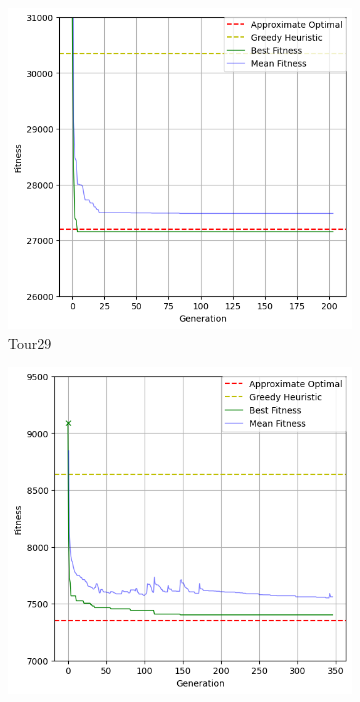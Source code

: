 \documentclass[a4paper,10pt]{article}
\begin{document}
\begin{figure}
\begin{subfigure}[t]{0.5\textwidth}
    \centering
	\includegraphics[width=\textwidth]{results/4.2/tour29_convergence.png}
    \caption{Tour29}
    \label{fig:tour29convergence}
\end{subfigure}
\begin{subfigure}[t]{0.5\textwidth}
    \centering
	\includegraphics[width=\textwidth]{results/4.3/tour100_convergence.png}

\end{subfigure}
\end{figure}
\end{document}
